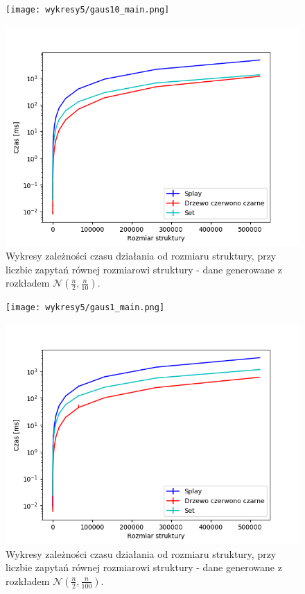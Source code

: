 \documentclass[declaration,shortabstract]{iithesis}
\theoremstyle{thm}
\theoremstyle{remark}
\theoremstyle{plain}
\theoremstyle{plain}
\theoremstyle{plain}
\begin{document}
\begin{figure}[H]
\begin{minipage}[b]{.45\textwidth}
\centering
\texttt{[image: wykresy5/gaus10\_main.png]}
\end{minipage}
\hfill
\begin{minipage}[b]{.45\textwidth}
\centering
\includegraphics[width=1\textwidth]{wykresy3/gaus10_main.png}
\end{minipage}
\caption{Wykresy zależności czasu działania od rozmiaru struktury, przy liczbie zapytań równej rozmiarowi struktury - dane generowane z rozkładem \(\mathcal{N}(\frac{n}{2}, \frac{n}{10})\).}
\end{figure}

\begin{figure}[H]
\begin{minipage}[b]{.45\textwidth}
\centering
\texttt{[image: wykresy5/gaus1\_main.png]}
\end{minipage}
\hfill
\begin{minipage}[b]{.45\textwidth}
\centering
\includegraphics[width=1\textwidth]{wykresy3/gaus1_main.png}
\end{minipage}
\caption{Wykresy zależności czasu działania od rozmiaru struktury, przy liczbie zapytań równej rozmiarowi struktury - dane generowane z rozkładem \(\mathcal{N}(\frac{n}{2}, \frac{n}{100})\).}
\end{figure}
\end{document}
